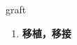 
\begin{frame}
{\huge graft}
\begin{center}
\begin{enumerate}\Large
  \item \textbf{移植，移接}
\end{enumerate}
\end{center}
\end{frame}
